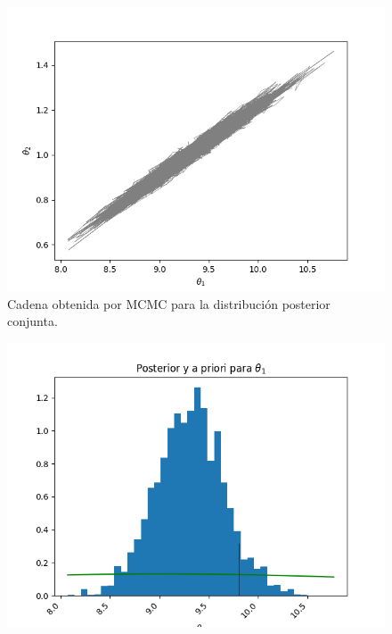 \begin{figure}[H] 
    \centering 
    \includegraphics[width = 10 cm ]{img/Exp_Central_gravedad_sigma/Figuras/Generales/Conjunta_gravedad_sigma.png} 
    \caption{Cadena obtenida por MCMC para la distribución posterior conjunta.}
    \label{Fig. 3.2.2.09}
\end{figure} 








\newpage




\begin{figure}[H] 
    \centering 
    \includegraphics[width = 10 cm ]{img/Exp_Central_gravedad_sigma/Figuras/Generales/Post_theta1_gravedad_sigma.png} 
\end{figure} 

